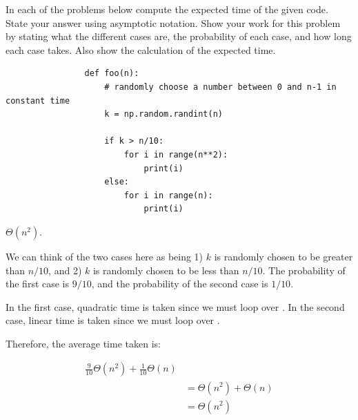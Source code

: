 \begin{prob}
    In each of the problems below compute the expected time of the given code.
    State your answer using asymptotic notation. Show your work for this
    problem by stating what the different cases are, the probability of each
    case, and how long each case takes. Also show the calculation of the
    expected time.

    \begin{subprobset}
        \begin{subprob}
            \begin{verbatim}
                def foo(n):
                    # randomly choose a number between 0 and n-1 in constant time
                    k = np.random.randint(n)

                    if k > n/10:
                        for i in range(n**2):
                            print(i)
                    else:
                        for i in range(n):
                            print(i)

            \end{verbatim}

            \begin{soln}
                $\Theta(n^{2})$.

                We can think of the two cases here as being 1) $k$ is randomly chosen
                to be greater than $n/10$, and 2) $k$ is randomly chosen to be less than $n/10$.
                The probability of the first case is $9/10$, and
                the probability of the second case is $1/10$.

                In the first case, quadratic time is taken since we must loop over .
                In the second case, linear time is taken since we must loop over .

                Therefore, the average time taken is:

                \begin{align*}
                    \frac{9}{10} \Theta(n^{2}) + \frac{1}{10} \Theta(n)\\
                    &=
                    \Theta(n^{2}) + \Theta(n)\\
                    &=
                    \Theta(n^{2})
                \end{align*}

            \end{soln}
        \end{subprob}


\end{subprobset}
\end{prob}
